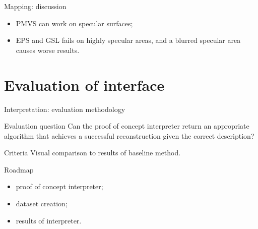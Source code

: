 \documentclass[10pt]{beamer}
\begin{document}
\begin{frame}{Mapping: discussion}

\begin{itemize}
\item PMVS can work on specular surfaces;
\item EPS and GSL fails on highly specular areas, and a blurred specular area causes worse results.
\end{itemize}

\end{frame}


\section{Evaluation of interface}
\begin{frame}{Interpretation: evaluation methodology}

\begin{exampleblock}{Evaluation question}
  Can the proof of concept interpreter return an appropriate algorithm that achieves a successful reconstruction given the correct description?
\end{exampleblock}

\begin{exampleblock}{Criteria}
  Visual comparison to results of baseline method.
\end{exampleblock}

\begin{exampleblock}{Roadmap}
  \begin{itemize}
    \item proof of concept interpreter;
    \item dataset creation;
    \item results of interpreter.
  \end{itemize}
\end{exampleblock}

\end{frame}
\end{document}
